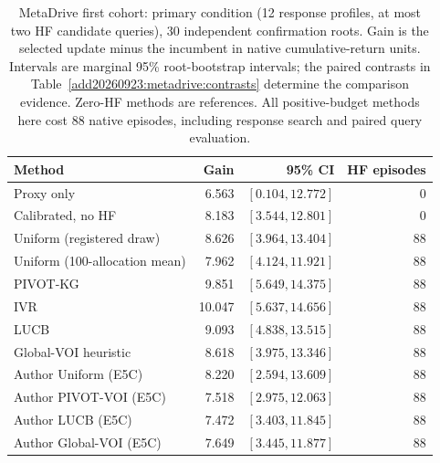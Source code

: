 \begin{table}[t]
\centering
\small
\caption{MetaDrive first cohort: primary condition (12 response profiles, at most two HF candidate queries), 30 independent confirmation roots. Gain is the selected update minus the incumbent in native cumulative-return units. Intervals are marginal 95\% root-bootstrap intervals; the paired contrasts in Table~\ref{add20260923:metadrive:contrasts} determine the comparison evidence. Zero-HF methods are references. All positive-budget methods here cost 88 native episodes, including response search and paired query evaluation.}
\label{add20260923:metadrive:methods}
\begin{tabular}{lrrr}
\hline
Method & Gain & 95\% CI & HF episodes \\
\hline
Proxy only & 6.563 & $[0.104, 12.772]$ & 0 \\
Calibrated, no HF & 8.183 & $[3.544, 12.801]$ & 0 \\
Uniform (registered draw) & 8.626 & $[3.964, 13.404]$ & 88 \\
Uniform (100-allocation mean) & 7.962 & $[4.124, 11.921]$ & 88 \\
PIVOT-KG & 9.851 & $[5.649, 14.375]$ & 88 \\
IVR & 10.047 & $[5.637, 14.656]$ & 88 \\
LUCB & 9.093 & $[4.838, 13.515]$ & 88 \\
Global-VOI heuristic & 8.618 & $[3.975, 13.346]$ & 88 \\
\hline
Author Uniform (E5C) & 8.220 & $[2.594, 13.609]$ & 88 \\
Author PIVOT-VOI (E5C) & 7.518 & $[2.975, 12.063]$ & 88 \\
Author LUCB (E5C) & 7.472 & $[3.403, 11.845]$ & 88 \\
Author Global-VOI (E5C) & 7.649 & $[3.445, 11.877]$ & 88 \\
\hline
\end{tabular}
\end{table}
